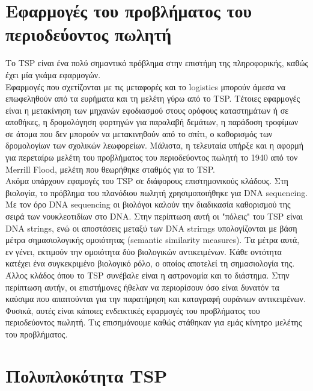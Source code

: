 \documentclass[oneside,12pt]{book}
\theoremstyle{definition}
\begin{document}
\chapter{Εφαρμογές του προβλήματος του περιοδεύοντος πωλητή}

Το TSP είναι ένα πολύ σημαντικό πρόβλημα στην επιστήμη της πληροφορικής, καθώς έχει μία γκάμα εφαρμογών. \\

Εφαρμογές που σχετίζονται με τις μεταφορές και το logistics μπορούν άμεσα να επωφεληθούν από τα ευρήματα και τη μελέτη γύρω από το TSP. Τέτοιες εφαρμογές είναι η μετακίνηση των μηχανών εφοδιασμού στους ορόφους καταστημάτων ή σε αποθήκες, η δρομολόγηση φορτηγών για παραλαβή δεμάτων, η παράδοση τροφίμων σε άτομα που δεν μπορούν να μετακινηθούν από το σπίτι, ο καθορισμός των δρομολογίων των σχολικών λεωφορείων. Μάλιστα, η τελευταία υπήρξε και η αφορμή για περεταίρω μελέτη του προβλήματος του περιοδεύοντος πωλητή το 1940 από τον Merrill Flood, μελέτη που θεωρήθηκε σταθμός για το TSP. \\

Ακόμα υπάρχουν εφαμογές του TSP σε διάφορους επιστημονικούς κλάδους. Στη βιολογία, το πρόβλημα του πλανόδιου πωλητή χρησιμοποιήθηκε για DNA sequencing. Με τον όρο DNA sequencing οι βιολόγοι καλούν την διαδικασία καθορισμού της σειρά των νουκλεοτιδίων στο DNA. Στην περίπτωση αυτή οι "πόλεις" του TSP είναι DNA strings, ενώ οι αποστάσεις μεταξύ των DNA strirngs υπολογίζονται με βάση μέτρα σημασιολογικής ομοιότητας (semantic similarity measures). Τα μέτρα αυτά, εν γένει, εκτιμούν την ομοιότητα δύο βιολογικών αντικειμένων.  Κάθε οντότητα κατέχει ένα συγκεκριμένο βιολογικό ρόλο, ο οποίος αποτελεί τη σημασιολογία της. \\

Άλλος κλάδος όπου το TSP συνέβαλε είναι η αστρονομία και το διάστημα. Στην περίπτωση αυτήν, οι επιστήμονες ήθελαν να περιορίσουν όσο είναι δυνατόν τα καύσιμα που απαιτούνται για την παρατήρηση και καταγραφή ουράνιων αντικειμένων. \\

Φυσικά, αυτές είναι κάποιες ενδεικτικές εφαρμογές του προβλήματος του περιοδεύοντος πωλητή. Τις επισημάνουμε καθώς στάθηκαν για εμάς κίνητρο μελέτης του προβλήματος. \\ 

\chapter{Πολυπλοκότητα TSP}
\end{document}
